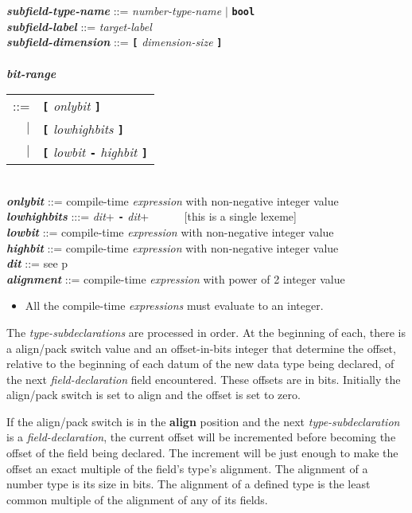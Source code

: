 \documentclass[12pt]{article}
\newcommand{\TT}[1]{{\tt \bfseries #1}}
\newcommand{\key}[1]{{\rm \bfseries #1}}
\newcommand{\emkey}[1]{{\em \bfseries #1}}
\newcommand{\pagref}[1]{p\pageref{#1}}
\newenvironment{indpar}[1][0.3in]%
	{\begin{list}{}%
		     {\setlength{\itemsep}{0in}%
		      \setlength{\topsep}{0in}%
		      \setlength{\parsep}{1ex}%
		      \setlength{\labelwidth}{#1}%
		      \setlength{\leftmargin}{#1}%
		      \addtolength{\leftmargin}{\labelsep}}%
	 \item}%
	{\end{list}}
\begin{document}
\begin{indpar}
\emkey{subfield-type-name}\label{SUBFIELD-TYPE-NAME} ::=
    {\em number-type-name} $|$ \TT{bool} \\
\emkey{subfield-label}\label{SUBFIELD-LABEL} ::=  {\em target-label} \\
\emkey{subfield-dimension} ::=  \TT{[} {\em dimension-size} \TT{]} \\
\\[2ex]
\emkey{bit-range}
    \begin{tabular}[t]{@{}rl}
    ::= &  \TT{[} {\em onlybit} \TT{]} \\
    $|$ &  \TT{[} {\em lowhighbits} \TT{]} \\
    $|$ &  \TT{[} {\em lowbit} \TT{-} {\em highbit} \TT{]}
    \end{tabular} \\
\emkey{onlybit} ::= compile-time {\em expression}
		    with non-negative integer value \\
\emkey{lowhighbits} :::= {\em dit}+ \TT{-} {\em dit}+
           ~~~~~ [this is a single lexeme] \\
\emkey{lowbit} ::= compile-time {\em expression}
		   with non-negative integer value \\
\emkey{highbit} ::= compile-time {\em expression}
		    with non-negative integer value \\
\emkey{dit} ::= see \pagref{DIT}
\\[2ex]
\emkey{alignment} ::= compile-time {\em expression}
		      with power of 2 integer value

\begin{itemize}
\item All the compile-time {\em expressions} must evaluate to an integer.
\end{itemize}
\end{indpar}

The {\em type-subdeclarations} are processed in order.  At the
beginning of each, there is a align/pack switch value and an
offset-in-bits integer that determine the offset, relative to the
beginning of each datum of the new data type being declared, of the next
{\em field-declaration} field encountered.  These offsets are in bits.
Initially the align/pack switch is set to align and the offset is
set to zero.

If the align/pack switch is in the \key{align} position and the
next {\em type-subdeclaration} is a {\em field-declaration}, the
current offset will be incremented before becoming the offset
of the field being declared.  The increment will be just enough
to make the offset an exact multiple of the field's type's alignment.
The alignment of a number type is its size in bits.  The alignment
of a defined type is the least common multiple of the alignment of
any of its fields.
\end{document}

